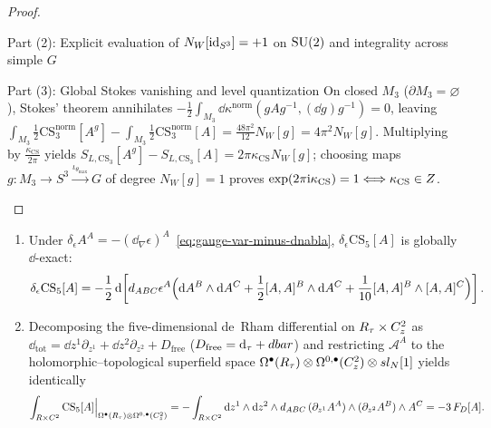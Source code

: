 \begin{proof}
\begin{proofpart}{Part (2): Explicit evaluation of $N_W[\operatorname{id}_{S^3}] = +1$ on $\operatorname{SU}(2)$ and integrality across simple $G$}
\end{proofpart}
\begin{proofpart}{Part (3): Global Stokes vanishing and level quantization}
On closed $M_3$ ($\partial M_3 = \varnothing$), Stokes' theorem annihilates $-\frac{1}{2}\int_{M_3}\dd\kappa^{\mathrm{norm}}(g A g^{-1},(\dd g)g^{-1}) = 0$, leaving $\int_{M_3}\frac{1}{2}\mathrm{CS}_3^{\mathrm{norm}}[A^g] - \int_{M_3}\frac{1}{2}\mathrm{CS}_3^{\mathrm{norm}}[A] = \frac{48\pi^2}{12}N_W[g] = 4\pi^2 N_W[g]$. Multiplying by $\frac{\kappa_{\mathrm{CS}}}{2\pi}$ yields $S_{L,\mathrm{CS}_3}[A^g] - S_{L,\mathrm{CS}_3}[A] = 2\pi\kappa_{\mathrm{CS}}N_W[g]$; choosing maps $g : M_3 \to S^3 \xrightarrow{\iota_{\theta_{\max}}} G$ of degree $N_W[g] = 1$ proves $\exp(2\pi\mathrm{i}\kappa_{\mathrm{CS}}) = 1 \Longleftrightarrow \kappa_{\mathrm{CS}} \in Z$.
\end{proofpart}
\end{proof}

\begin{proposition}[{Gauge variation of $\mathrm{CS}_5[A]$ under $\delta_\epsilon A = -\dd_\nabla\epsilon$ and HT restriction $\int\mathrm{CS}_5|_{\mathrm{HT}} = -3 F_D$}]
\label{prop:cs5-transgression-fd}
\leavevmode
\begin{enumerate}[label=(\arabic*),leftmargin=*]
  \item Under $\delta_\epsilon A^A = -(\dd_\nabla\epsilon)^A$~\eqref{eq:gauge-var-minus-dnabla}, $\delta_\epsilon\mathrm{CS}_5[A]$ is globally $\dd$-exact:
  \[
  \delta_\epsilon\mathrm{CS}_5[A] = -\frac{1}{2}\,\mathrm{d}\!\left[d_{ABC}\epsilon^A\Bigl(\mathrm{d} A^B\wedge\mathrm{d} A^C + \frac{1}{2}[A,A]^B\wedge\mathrm{d} A^C + \frac{1}{10}[A,A]^B\wedge[A,A]^C\Bigr)\right].
  \]
  \item Decomposing the five-dimensional de~Rham differential on $R_\tau\times C^2_z$ as $\dd_{\mathrm{tot}} = \dd z^1\partial_{z^1} + \dd z^2\partial_{z^2} + D_{\mathrm{free}}$ ($D_{\mathrm{free}} = \mathrm{d}_\tau + dbar$) and restricting $\mathcal{A}^A$ to the holomorphic--topological superfield space $\Omega^\bullet(R_\tau)\otimes\Omega^{0,\bullet}(C^2_z)\otimes sl_N[1]$ yields identically
  \begin{equation}
  \label{eq:cs5-equals-minus-3FD}
  \int_{R\times C^2}\mathrm{CS}_5[A]\Big|_{\Omega^\bullet(R_\tau)\otimes\Omega^{0,\bullet}(C^2_z)} = -\int_{R\times C^2}\mathrm{d} z^1\wedge\mathrm{d} z^2\wedge d_{ABC}\,(\partial_{z^1}A^A)\wedge(\partial_{z^2}A^B)\wedge A^C = -3\,F_D[A].
  \end{equation}
\end{enumerate}
\end{proposition}


